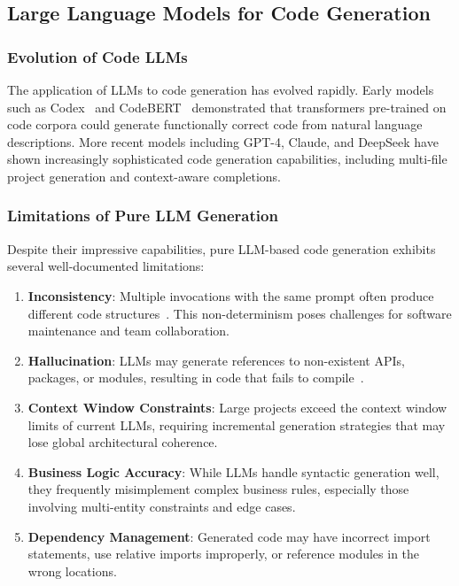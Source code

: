 \documentclass[11pt,a4paper]{article}
\begin{document}
\subsection{Large Language Models for Code Generation}

\subsubsection{Evolution of Code LLMs}

The application of LLMs to code generation has evolved rapidly. Early models such as Codex~\cite{chen2021codex} and CodeBERT~\cite{feng2020codebert} demonstrated that transformers pre-trained on code corpora could generate functionally correct code from natural language descriptions. More recent models including GPT-4, Claude, and DeepSeek have shown increasingly sophisticated code generation capabilities, including multi-file project generation and context-aware completions.

\subsubsection{Limitations of Pure LLM Generation}

Despite their impressive capabilities, pure LLM-based code generation exhibits several well-documented limitations:

\begin{enumerate}[leftmargin=*]
    \item \textbf{Inconsistency}: Multiple invocations with the same prompt often produce different code structures~\cite{liu2023evaluating}. This non-determinism poses challenges for software maintenance and team collaboration.
    \item \textbf{Hallucination}: LLMs may generate references to non-existent APIs, packages, or modules, resulting in code that fails to compile~\cite{ji2023survey}.
    \item \textbf{Context Window Constraints}: Large projects exceed the context window limits of current LLMs, requiring incremental generation strategies that may lose global architectural coherence.
    \item \textbf{Business Logic Accuracy}: While LLMs handle syntactic generation well, they frequently misimplement complex business rules, especially those involving multi-entity constraints and edge cases.
    \item \textbf{Dependency Management}: Generated code may have incorrect import statements, use relative imports improperly, or reference modules in the wrong locations.
\end{enumerate}
\end{document}
